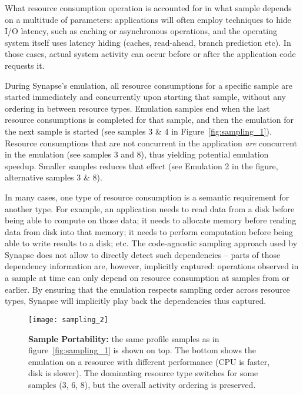\documentclass[10pt, conference, compsocconf]{IEEEtran}
\newcommand{\I}[1]{\textit{#1}\xspace}
\newcommand{\synapse}{Synapse\xspace}
\begin{document}
  What resource consumption operation is accounted for in what sample
  depends on a multitude of parameters: applications will often employ
  techniques to hide I/O latency, such as caching or asynchronous
  operations, and the operating system itself uses latency hiding
  (caches, read-ahead, branch prediction etc).  In those cases, actual
  system activity can occur before or after the application code
  requests it.
  
  During \synapse's emulation, all resource consumptions for
  a specific sample are started immediately and concurrently upon
  starting that sample, without any ordering in between resource
  types.  Emulation samples end when the last resource consumptions is
  completed for that sample, and then the emulation for the next
  sample is started (see samples 3 \& 4 in
  Figure~\ref{fig:sampling_1}).  Resource consumptions that are not
  concurrent in the application \I{are} concurrent in the emulation
  (see samples 3 and 8), thus yielding potential emulation speedup.
  Smaller samples reduces that effect (see Emulation 2 in the figure,
  alternative samples 3 \& 8).  
  


  In many cases, one type of resource consumption is a semantic
  requirement for another type.  For example, an application needs to
  read data from a disk before being able to compute on those data; it
  needs to allocate memory before reading data from disk into that memory;
  it needs to perform computation before being able to write results
  to a disk; etc.  The code-agnostic sampling approach used by
  \synapse does not allow to directly detect such dependencies --
  parts of those dependency information are, however, implicitly
  captured: operations observed in a sample at time  can only
  depend on resource consumption at samples from  or
  earlier.  By
  ensuring that the emulation respects sampling order across resource
  types, \synapse will implicitly play back the dependencies thus
  captured.

 \begin{figure}[t]
   \centering
   \texttt{[image: sampling\_2]}
   \caption{\textbf{Sample Portability:} the same profile samples as
       in figure~\ref{fig:sampling_1} is shown on top.  The bottom
       shows the emulation on a resource with different performance
       (CPU is  faster, disk is  slower).  The dominating
       resource type switches for some samples (3, 6, 8), but the
       overall activity ordering is preserved.
     \label{fig:sampling_2} 
   } 
   \end{figure}
\end{document}

